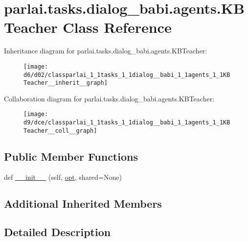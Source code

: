 \hypertarget{classparlai_1_1tasks_1_1dialog__babi_1_1agents_1_1KBTeacher}{}\section{parlai.\+tasks.\+dialog\+\_\+babi.\+agents.\+K\+B\+Teacher Class Reference}
\label{classparlai_1_1tasks_1_1dialog__babi_1_1agents_1_1KBTeacher}


Inheritance diagram for parlai.\+tasks.\+dialog\+\_\+babi.\+agents.\+K\+B\+Teacher\+:
\nopagebreak
\begin{figure}[H]
\begin{center}
\leavevmode
\texttt{[image: d6/d02/classparlai\_1\_1tasks\_1\_1dialog\_\_babi\_1\_1agents\_1\_1KBTeacher\_\_inherit\_\_graph]}
\end{center}
\end{figure}


Collaboration diagram for parlai.\+tasks.\+dialog\+\_\+babi.\+agents.\+K\+B\+Teacher\+:
\nopagebreak
\begin{figure}[H]
\begin{center}
\leavevmode
\texttt{[image: d9/dce/classparlai\_1\_1tasks\_1\_1dialog\_\_babi\_1\_1agents\_1\_1KBTeacher\_\_coll\_\_graph]}
\end{center}
\end{figure}
\subsection*{Public Member Functions}
\begin{DoxyCompactItemize}
\item 
def \hyperlink{classparlai_1_1tasks_1_1dialog__babi_1_1agents_1_1KBTeacher_ac822ca7f017823413af0eebd531bee41}{\+\_\+\+\_\+init\+\_\+\+\_\+} (self, \hyperlink{classparlai_1_1core_1_1teachers_1_1FbDialogTeacher_af7a9ec497b9cd0292d7b8fa220da7c28}{opt}, shared=None)
\end{DoxyCompactItemize}
\subsection*{Additional Inherited Members}


\subsection{Detailed Description}


